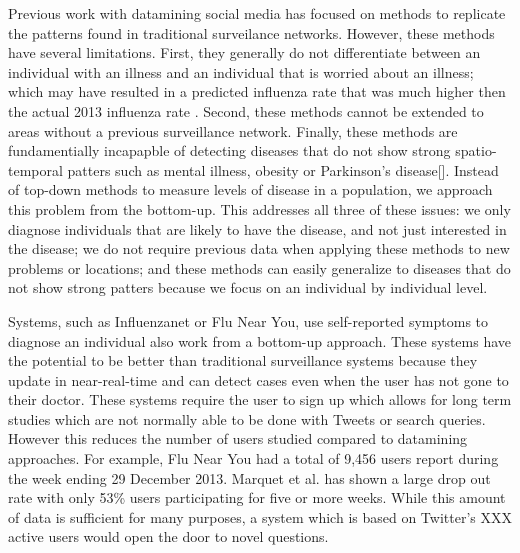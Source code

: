 \documentclass{acm_proc_article-sp}
\begin{document}
Previous work with datamining social media has focused on methods to replicate the patterns found in traditional surveilance networks\cite{Bodnar:2013we,Culotta:2010hx,Goel:2010jf}. However, these methods have several limitations. First, they generally do not differentiate between an individual with an illness and an individual that is worried about an illness; which may have resulted in a predicted influenza rate that was much higher then the actual 2013 influenza rate \cite{Bodnar:2013we,Butler:2013uh,Olson:2013bo,Lamb:2013to}. Second, these methods cannot be extended to areas without a previous surveillance network. Finally, these methods are fundamentially incapapble of detecting diseases that do not show strong spatio-temporal patters such as mental illness, obesity or Parkinson's disease[]. Instead of top-down methods to measure levels of disease in a population, we approach this problem from the bottom-up. This addresses all three of these issues: we only diagnose individuals that are likely to have the disease, and not just interested in the disease; we do not require previous data when applying these methods to new problems or locations; and these methods can easily generalize to diseases that do not show strong patters because we focus on an individual by individual level.

Systems, such as Influenzanet or Flu Near You, use self-reported symptoms to diagnose an individual also work from a bottom-up approach.\cite{Marquet:2005tb,VanNoort:2007uk} These systems have the potential to be better than traditional surveillance systems because they update in near-real-time and can detect cases even when the user has not gone to their doctor. These systems require the user to sign up which allows for long term studies which are not normally able to be done with Tweets or search queries. However this reduces the number of users studied compared to datamining approaches. For example, Flu Near You had a total of 9,456 users report during the week ending 29 December 2013. Marquet et al. \cite{Marquet:2005tb} has shown a large drop out rate with only 53\% users participating for five or more weeks. While this amount of data is sufficient for many purposes, a system which is based on Twitter's XXX active users would open the door to novel questions.


%
%
\end{document}
